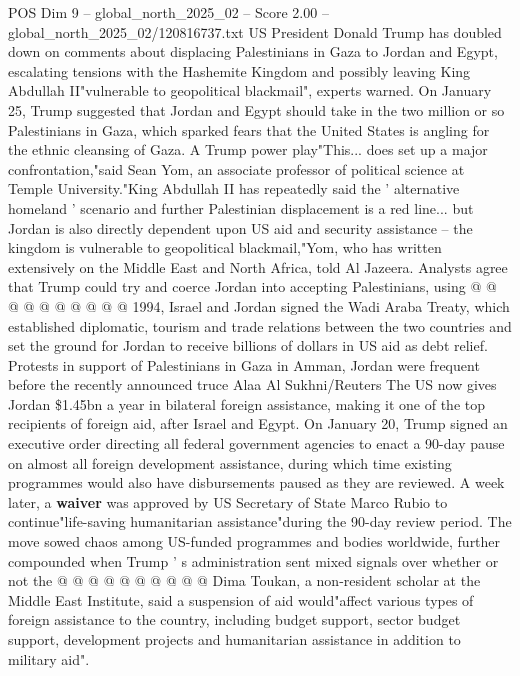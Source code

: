 \begin{textsample}{POS Dim 9 – global\_north\_2025\_02 – Score 2.00 – global\_north\_2025\_02/120816737.txt}  \label{ex:f9_pos_388}
US President Donald Trump has doubled down on comments about displacing Palestinians in Gaza to Jordan and Egypt, escalating tensions with the Hashemite Kingdom and possibly leaving King Abdullah II"vulnerable to geopolitical blackmail", experts warned.
On January 25, Trump suggested that Jordan and Egypt should take in the two million or so Palestinians in Gaza, which sparked fears that the United States is angling for the ethnic cleansing of Gaza.
A Trump power play"This... does set up a major confrontation,"said Sean Yom, an associate professor of political science at Temple University."King Abdullah II has repeatedly said the ' alternative homeland ' scenario and further Palestinian displacement is a red line... but Jordan is also directly dependent upon US aid and security assistance -- the kingdom is vulnerable to geopolitical blackmail,"Yom, who has written extensively on the Middle East and North Africa, told Al Jazeera.
Analysts agree that Trump could try and coerce Jordan into accepting Palestinians, using @ @ @ @ @ @ @ @ @ @ 1994, Israel and Jordan signed the Wadi Araba Treaty, which established diplomatic, tourism and trade relations between the two countries and set the ground for Jordan to receive billions of dollars in US aid as debt relief.
Protests in support of Palestinians in Gaza in Amman, Jordan were frequent before the recently announced truce Alaa Al Sukhni/Reuters The US now gives Jordan \$1.45bn a year in bilateral foreign assistance, making it one of the top recipients of foreign aid, after Israel and Egypt.
On January 20, Trump signed an executive order directing all federal government agencies to enact a 90-day pause on almost all foreign development assistance, during which time existing programmes would also have disbursements paused as they are reviewed.
A week later, a \textbf{waiver} was approved by US Secretary of State Marco Rubio to continue"life-saving humanitarian assistance"during the 90-day review period.
The move sowed chaos among US-funded programmes and bodies worldwide, further compounded when Trump ' s administration sent mixed signals over whether or not the @ @ @ @ @ @ @ @ @ @ Dima Toukan, a non-resident scholar at the Middle East Institute, said a suspension of aid would"affect various types of foreign assistance to the country, including budget support, sector budget support, development projects and humanitarian assistance in addition to military aid".

\end{textsample}
